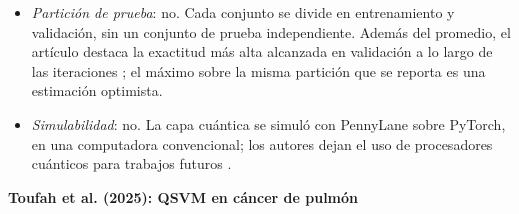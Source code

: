 \begin{itemize}
  \item \textit{Partición de prueba}: no.
  Cada conjunto se divide en entrenamiento y validación, sin un conjunto de prueba independiente. Además del promedio, el artículo destaca la exactitud más alta alcanzada en validación a lo largo de las iteraciones \cite{Xiang2024QuantumCNN}; el máximo sobre la misma partición que se reporta es una estimación optimista.
  \item \textit{Simulabilidad}: no.
  La capa cuántica se simuló con PennyLane sobre PyTorch, en una computadora convencional; los autores dejan el uso de procesadores cuánticos para trabajos futuros \cite{Xiang2024QuantumCNN}.
\end{itemize}

\textbf{Toufah et al. (2025): QSVM en cáncer de pulmón}

